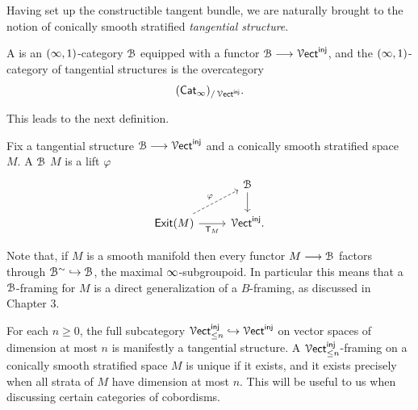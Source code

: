 Having set up the constructible tangent bundle, we are naturally brought to the notion of conically smooth stratified \emph{tangential structure}.

\begin{definition}\label{ch4:: def: tangential structure}\cite[Definition~2.17]{AFR2}
    A  is an $(\operatorname{\infty},1)$-category $\mathcal B$ equipped with a functor $\mathcal B \longrightarrow \operatorname{\mathcal V{\sf ect}}^{\sf inj}$, and the $(\operatorname{\infty},1)$-category of tangential structures is the overcategory
    \begin{equation}
        (\operatorname{{\sf Cat}}_{\operatorname{\infty}})_{/\operatorname{\mathcal V{\sf ect}}^{\operatorname{\mathsf{inj}}}}.
    \end{equation}
\end{definition}

This leads to the next definition.

\begin{definition}\label{ch4:: def: tangential structure 2}\cite[Definition~2.19]{AFR2}
    Fix a tangential structure $\mathcal B \longrightarrow \operatorname{\mathcal V{\sf ect}}^{\operatorname{\mathsf{inj}}}$ and a conically smooth stratified space $M$. A $\mathcal B$ $M$ is a lift $\varphi$
    \begin{equation}
    \begin{tikzcd}[ampersand replacement=\&]
        \& \cB \\
        {\exit(M)} \& {\Vect^{\inj}}.
        \arrow[from=1-2, to=2-2]
        \arrow["\varphi", dashed, from=2-1, to=1-2]
        \arrow["{\sT_M}"', from=2-1, to=2-2]
    \end{tikzcd}
    \end{equation} 
\end{definition}

\begin{remark}
    Note that, if $M$ is a smooth manifold then every functor $M \longrightarrow \mathcal B$ factors through $\mathcal B^{\sim} \hookrightarrow \mathcal B$, the maximal $\operatorname{\infty}$-subgroupoid. In particular this means that a $\mathcal B$-framing for $M$ is a direct generalization of a $B$-framing, as discussed in Chapter 3.
\end{remark}


\begin{example}
    For each $n \geq 0$, the full subcategory $\operatorname{\mathcal V{\sf ect}}^{\sf inj}_{\leq n} \hookrightarrow \operatorname{\mathcal V{\sf ect}}^{\sf inj}$ on vector spaces of dimension at most $n$ is manifestly a tangential structure. A $\operatorname{\mathcal V{\sf ect}}^{\sf inj}_{\leq n}$-framing on a conically smooth stratified space $M$ is unique if it exists, and it exists precisely when all strata of $M$ have dimension at most $n$. This will be useful to us when discussing certain categories of cobordisms.
\end{example}

